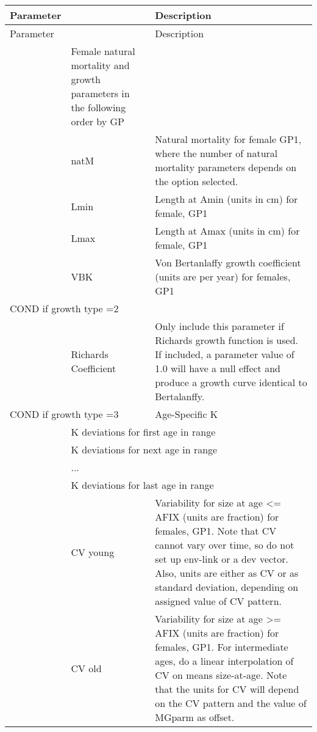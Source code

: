 \begin{center}
	\begin{longtable}{p{1cm} p{2.5cm} p{10cm}}

		Parameter& & Description\\
		\hline
		\endfirsthead

		Parameter& & Description\\
		\hline
		\endhead

		\endfoot

		\endlastfoot

		\multicolumn{2}{l}{Females} & Female natural mortality and growth parameters in the following order by GP\\
		& natM & Natural mortality for female GP1, where the number of natural mortality parameters depends on the option selected.\\
		& Lmin & Length at Amin (units in cm) for female, GP1 \\
		& Lmax & Length at Amax (units in cm) for female, GP1 \\
		& VBK & Von Bertanlaffy growth coefficient (units are per year) for females, GP1\\
		\hline
		\multicolumn{2}{l}{COND if growth type =2 } & \\
		& Richards Coefficient & Only include this parameter if Richards growth function is used.  If included, a parameter value of 1.0 will have a null effect and produce a growth curve identical to Bertalanffy.\\
		\multicolumn{2}{l}{COND if growth type =3 } & Age-Specific K \\
		& \multicolumn{2}{l}{K deviations for first age in range}\\
		& \multicolumn{2}{l}{K deviations for next age in range}\\
		& ... & \\
		& \multicolumn{2}{l}{K deviations for last age in range}\\
		\hline
	    & CV young & Variability for size at age <= AFIX (units are fraction) for females, GP1.  Note that CV cannot vary over time, so do not set up env-link or a dev vector.  Also, units are either as CV or as standard deviation, depending on assigned value of CV pattern.\\
		& CV old & Variability for size at age >= AFIX (units are fraction) for females, GP1. For intermediate ages, do a linear interpolation of CV on means size-at-age.  Note that the units for CV will depend on the CV pattern and the value of MGparm as offset.\\

\end{longtable}
\end{center}
